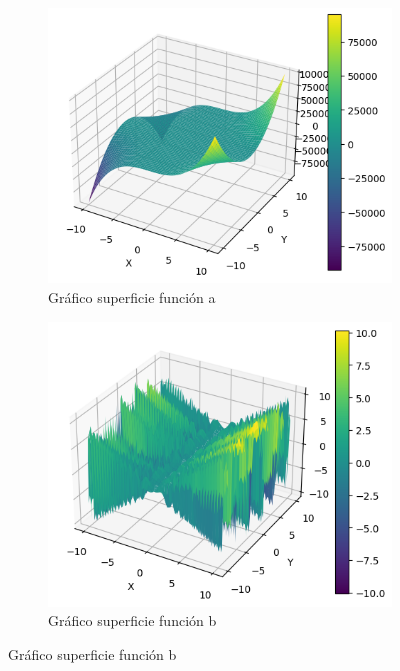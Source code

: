 \documentclass[12 pt]{article}
\begin{document}
\begin{figure}[H]
    \centering
    \begin{subfigure}[b]{0.45\linewidth}
        \centering
        \includegraphics[width=\linewidth]{img/a.png}
        \caption{Gráfico superficie función a}
        \label{fig:w1}
    \end{subfigure}
    \hfill
    \begin{subfigure}[b]{0.45\linewidth}
        \centering
        \includegraphics[width=\linewidth]{img/b.png}
        \caption{Gráfico superficie función b}
        \label{fig:w2}

\end{subfigure}
\end{figure}
\end{document}

